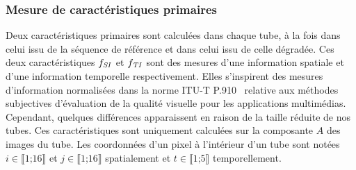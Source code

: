 \subsubsection{Mesure de caractéristiques primaires}
Deux caractéristiques primaires sont calculées dans chaque tube, à la fois dans celui issu de la séquence de référence et dans celui issu de celle dégradée. Ces deux caractéristiques $f_{\mathit{SI}}$ et $f_{\mathit{TI}}$ sont des mesures d'une information spatiale et d'une information temporelle respectivement. Elles s'inspirent des mesures d'information normalisées dans la norme ITU-T P.910~\cite{itu-p910} relative aux méthodes subjectives d'évaluation de la qualité visuelle pour les applications multimédias. Cependant, quelques différences apparaissent en raison de la taille réduite de nos tubes. Ces caractéristiques sont uniquement calculées sur la composante $A$ des images du tube. Les coordonnées d'un pixel à l'intérieur d'un tube sont notées $i\in\llbracket\text{1;16}\rrbracket$ et $j\in\llbracket\text{1;16}\rrbracket$ spatialement et $t\in\llbracket\text{1;5}\rrbracket$ temporellement.


